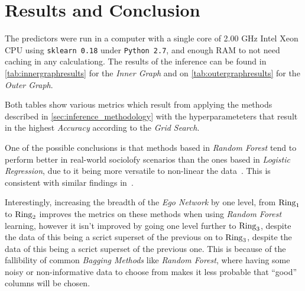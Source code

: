 \section{Results and Conclusion}
\label{sec:results}


The predictors were run in a computer with a single core of 2.00 GHz Intel Xeon CPU using \texttt{sklearn 0.18} under \texttt{Python 2.7}, and enough RAM to not need caching in any calculationg. The results of the inference can be found in \cref{tab:innergraphresults} for the \emph{Inner Graph} and on \cref{tab:outergraphresults} for the \emph{Outer Graph}.


Both tables show various metrics which result from applying the methods described in \cref{sec:inference_methodology} with the hyperparameteters that result in the highest \emph{Accuracy} according to the \emph{Grid Search}.

One of the possible conclusions is that methods based in \emph{Random Forest} tend to perform better in real-world sociolofy scenarios than the ones based in \emph{Logistic Regression}, due to it being more versatile to non-linear the data~\cite{logisticvsdecision}. This is consistent with similar findings in~\cite{muchlinski2016}.

Interestingly, increasing the breadth of the \emph{Ego Network} by one level, from $\operatorname{Ring}_1$ to $\operatorname{Ring}_2$ improves the metrics on these methods when using \emph{Random Forest} learning, however it isn't improved by going one level further to $\operatorname{Ring}_3$, despite the data of this being a scrict superset of the previous on to $\operatorname{Ring}_3$, despite the data of this being a scrict superset of the previous one. This is because of the fallibility of common \emph{Bagging Methods} like \emph{Random Forest}, where having some noisy or non-informative data to choose from makes it less probable that ``good'' columns will be chosen.

